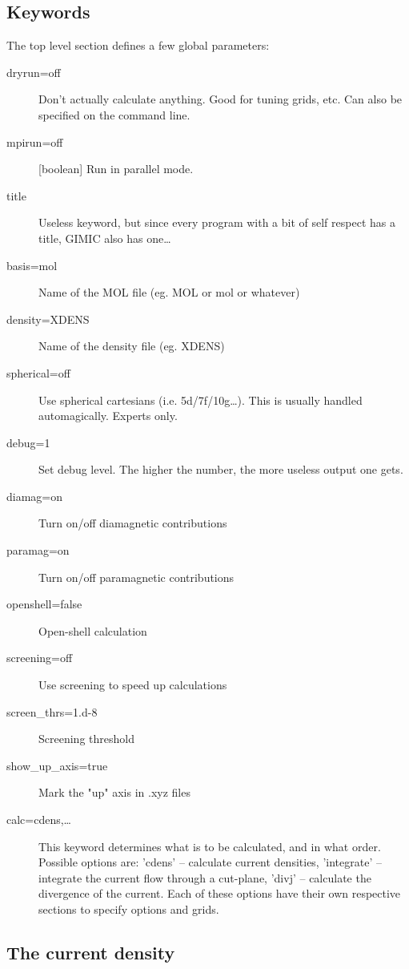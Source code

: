 \documentclass[a4paper,11pt]{article}
\begin{document}
\subsection{Keywords}
The top level section defines a few global parameters:
\begin{description}
  \item[dryrun=off] Don't actually calculate anything. 
	Good for tuning grids, etc. Can also be specified on the command line.
  \item[mpirun=off] [boolean] Run in parallel mode.
  \item[title] Useless keyword, but since every program with a bit of self
	respect has a title, GIMIC also has one\ldots
  \item[basis=mol] Name of the MOL file (eg. MOL or mol or whatever)	
  \item[density=XDENS] Name of the density file (eg. XDENS)	
  \item[spherical=off] Use spherical cartesians
	(i.e. 5d/7f/10g\ldots). This is usually handled automagically. Experts only.
  \item[debug=1] Set debug level. The higher the number, the more useless
	output one gets.
  \item[diamag=on] Turn on/off diamagnetic contributions
  \item[paramag=on]  Turn on/off paramagnetic contributions
  \item[openshell=false] Open-shell calculation
  \item[screening=off]    Use screening to speed up calculations
  \item[screen\_thrs=1.d-8]  Screening threshold
  \item[show\_up\_axis=true]   Mark the "up" axis in .xyz files
  \item[calc=\lbrack cdens,\ldots\rbrack]  This keyword determines what is to be
	calculated, and in what order. Possible options are: 'cdens' -- calculate
	current densities, 'integrate' -- integrate the current flow through a
	cut-plane, 'divj' -- calculate the divergence of the current. Each of
	these options have their own respective sections to specify options and
	grids.
\end{description}

\subsection{The current density}
\end{document}
